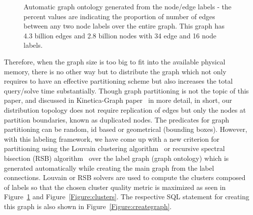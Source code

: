 \documentclass[preprint,3p,twocolumn]{elsarticle}
\begin{document}
\begin{figure}
\centering
    \caption{Automatic graph ontology generated from the node/edge labels - the percent values are indicating the proportion of number of edges between any two node labels over the entire graph. This graph has 4.3 billion edges and 2.8 billion nodes with 34 edge and 16 node labels.}
    \label{Figure:ontology}
\end{figure}

Therefore, when the graph size is too big to fit into the available physical memory, there is no other way but to distribute the graph which not only requires to have an effective partitioning scheme but also increases the total query/solve time substantially. Though graph partitioning is not the topic of this paper, and discussed in Kinetica-Graph paper~\cite{kineticagraph} in more detail, in short, our distribution topology does not require replication of edges but only the nodes at partition boundaries, known as duplicated nodes. The predicates for graph partitioning can be random, id based or geometrical (bounding boxes). However, with this labeling framework, we have come up with a new criterion for partitioning using the Louvain clustering algorithm~\cite{louvain} or recursive spectral bisection (RSB) algorithm~\cite{rsb} over the label graph (graph ontology) which is generated automatically while creating the main graph from the label connections. Louvain or RSB solvers are used to compute the clusters composed of labels so that the chosen cluster quality metric is maximized as seen in Figure~\ref{Figure:ontology} and Figure~\ref{Figure:clusters}. The respective SQL statement for creating this graph is also shown in Figure~\ref{Figure:creategraph}.  
\end{document}
